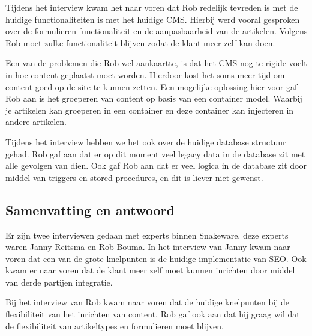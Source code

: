 \whitespace
Tijdens het interview kwam het naar voren dat Rob redelijk tevreden is met de huidige functionaliteiten is met het huidige CMS. 
Hierbij werd vooral gesproken over de formulieren functionaliteit en de aanpasbaarheid van de artikelen.
Volgens Rob moet zulke functionaliteit blijven zodat de klant meer zelf kan doen.

\whitespace
Een van de problemen die Rob wel aankaartte, is dat het CMS nog te rigide voelt in hoe content geplaatst moet worden.
Hierdoor kost het soms meer tijd om content goed op de site te kunnen zetten.
Een mogelijke oplossing hier voor gaf Rob aan is het groeperen van content op basis van een container model.
Waarbij je artikelen kan groeperen in een container en deze container kan injecteren in andere artikelen.

\whitespace
Tijdens het interview hebben we het ook over de huidige database structuur gehad.
Rob gaf aan dat er op dit moment veel legacy data in de database zit met alle gevolgen van dien.
Ook gaf Rob aan dat er veel logica in de database zit door middel van triggers en stored procedures, en dit is liever niet gewenst.

\subsection{Samenvatting en antwoord}
Er zijn twee interviewen gedaan met experts binnen Snakeware, deze experts waren Janny Reitsma en Rob Bouma.
In het interview van Janny kwam naar voren dat een van de grote knelpunten is de huidige implementatie van \gls{SEO}.
Ook kwam er naar voren dat de klant meer zelf moet kunnen inrichten door middel van derde partijen integratie.

\whitespace
Bij het interview van Rob kwam naar voren dat de huidige knelpunten bij de flexibiliteit van het inrichten van content.
Rob gaf ook aan dat hij graag wil dat de flexibiliteit van artikeltypes en formulieren moet blijven.
